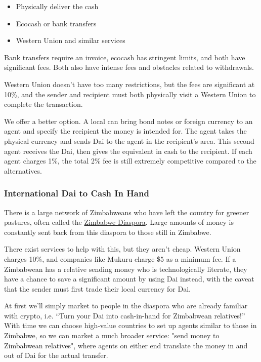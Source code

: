 \documentclass{article}
\begin{document}
\begin{itemize}
	\item Physically deliver the cash
	\item Ecocash or bank transfers
	\item Western Union and similar services
\end{itemize}	

Bank transfers require an invoice, ecocash has stringent limits, and both have significant fees. Both also have intense fees and obstacles related to withdrawals.

Western Union doesn't have too many restrictions, but the fees are significant at 10\%, and the sender and recipient must both physically visit a Western Union to complete the transaction.

We offer a better option. A local can bring bond notes or foreign currency to an agent and specify the recipient the money is intended for. The agent takes the physical currency and sends Dai to the agent in the recipient's area. This second agent receives the Dai, then gives the equivalent in cash to the recipient. If each agent charges 1\%, the total 2\% fee is still extremely competitive compared to the alternatives.

\subsubsection{International Dai to Cash In Hand} \label{remittance}

There is a large network of Zimbabweans who have left the country for greener pastures, often called the \href{https://en.wikipedia.org/wiki/Zimbabwean_diaspora}{Zimbabwe Diaspora}. Large amounts of money is constantly sent back from this diaspora to those still in Zimbabwe.

There exist services to help with this, but they aren't cheap. Western Union charges 10\%, and companies like Mukuru charge \$5 as a minimum fee. If a Zimbabwean has a relative sending money who is technologically literate, they have a chance to save a significant amount by using Dai instead, with the caveat that the sender must first trade their local currency for Dai.

At first we'll simply market to people in the diaspora who are already familiar with crypto, i.e. ``Turn your Dai into cash-in-hand for Zimbabwean relatives!'' With time we can choose high-value countries to set up agents similar to those in Zimbabwe, so we can market a much broader service: "send money to Zimbabwean relatives", where agents on either end translate the money in and out of Dai for the actual transfer.
\end{document}
